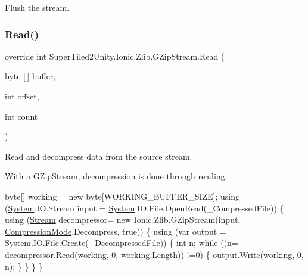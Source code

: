 Flush the stream. 

\mbox{\label{class_super_tiled2_unity_1_1_ionic_1_1_zlib_1_1_g_zip_stream_a772b5013a585850ffaf8be4aa7f3dbcf}} 
\subsubsection{\texorpdfstring{Read()}{Read()}}
{\footnotesize\ttfamily override int Super\+Tiled2\+Unity.\+Ionic.\+Zlib.\+G\+Zip\+Stream.\+Read (\begin{DoxyParamCaption}\item[{byte \mbox{[}$\,$\mbox{]}}]{buffer,  }\item[{int}]{offset,  }\item[{int}]{count }\end{DoxyParamCaption})}



Read and decompress data from the source stream. 

With a {\ttfamily \mbox{\hyperlink{class_super_tiled2_unity_1_1_ionic_1_1_zlib_1_1_g_zip_stream}{G\+Zip\+Stream}}}, decompression is done through reading. 


\begin{DoxyCode}
byte[] working = \textcolor{keyword}{new} byte[WORKING\_BUFFER\_SIZE];
\textcolor{keyword}{using} (\mbox{\hyperlink{namespace_system}{System}}.IO.Stream input = \mbox{\hyperlink{namespace_system}{System}}.IO.File.OpenRead(\_CompressedFile))
\{
    \textcolor{keyword}{using} (\mbox{\hyperlink{namespace_super_tiled2_unity_1_1_ionic_1_1_zip_a9ced5352c56e7e0fceff15b534073c83aeae835e83c0494a376229f254f7d3392}{Stream}} decompressor= \textcolor{keyword}{new} Ionic.Zlib.GZipStream(input, 
      \mbox{\hyperlink{namespace_super_tiled2_unity_1_1_ionic_1_1_zlib_ad5b7635d92497e1c905e5de82eb1c6b1}{CompressionMode}}.Decompress, \textcolor{keyword}{true}))
    \{
        \textcolor{keyword}{using} (var output = \mbox{\hyperlink{namespace_system}{System}}.IO.File.Create(\_DecompressedFile))
        \{
            \textcolor{keywordtype}{int} n;
            \textcolor{keywordflow}{while} ((n= decompressor.Read(working, 0, working.Length)) !=0)
            \{
                output.Write(working, 0, n);
            \}
        \}
    \}
\}
\end{DoxyCode}
 


